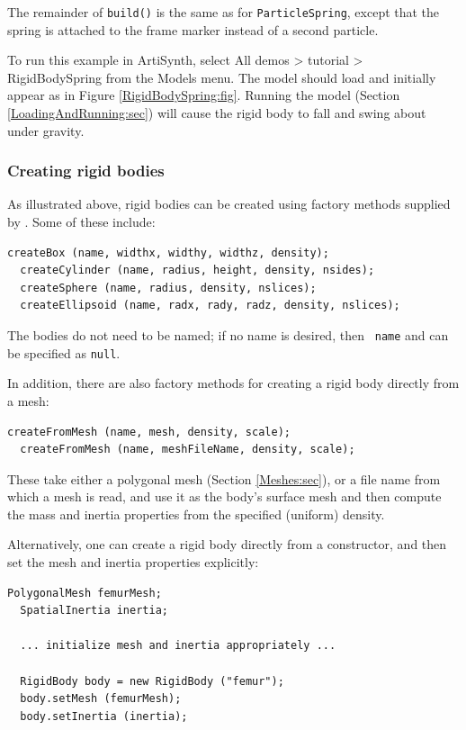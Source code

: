 The remainder of {\tt build()} is the same as for {\tt ParticleSpring},
except that the spring is attached to the frame marker instead of a
second particle.

To run this example in ArtiSynth, select {\sf All demos > tutorial >
RigidBodySpring} from the {\sf Models} menu. The model should load and
initially appear as in Figure \ref{RigidBodySpring:fig}.  Running the
model (Section \ref{LoadingAndRunning:sec}) will cause the rigid body
to fall and swing about under gravity.

\subsubsection{Creating rigid bodies}

As illustrated above, rigid bodies can be created using factory
methods supplied by .
Some of these include:
%
\begin{lstlisting}[]
  createBox (name, widthx, widthy, widthz, density);
  createCylinder (name, radius, height, density, nsides);
  createSphere (name, radius, density, nslices);
  createEllipsoid (name, radx, rady, radz, density, nslices);
\end{lstlisting}
%
The bodies do not need to be named; if no name is desired, then {\tt
name} and can be specified as {\tt null}.

In addition, there are also
factory methods for creating a rigid body directly from a mesh:
%
\begin{lstlisting}[]
  createFromMesh (name, mesh, density, scale);
  createFromMesh (name, meshFileName, density, scale);
\end{lstlisting}
%
These take either a polygonal mesh (Section \ref{Meshes:sec}), or a
file name from which a mesh is read, and use it as the body's surface
mesh and then compute the mass and inertia properties from the specified
(uniform) density.

Alternatively, one can create a rigid body directly from a
constructor, and then set the mesh and inertia properties explicitly:
%
\begin{lstlisting}[]
  PolygonalMesh femurMesh;
  SpatialInertia inertia;

  ... initialize mesh and inertia appropriately ...

  RigidBody body = new RigidBody ("femur");
  body.setMesh (femurMesh);
  body.setInertia (inertia);
\end{lstlisting}
%

